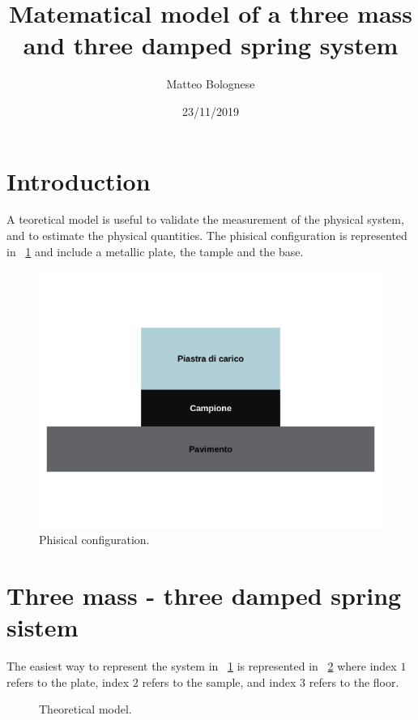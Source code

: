 \documentclass[12pt,a4paper]{article}
\begin{document}
 	\title{Matematical model of a three mass and three damped spring system} \author{Matteo Bolognese}
 	\date{23/11/2019}
 	\maketitle
 	
 \section{Introduction}
	A teoretical model is useful to validate the measurement of the physical system, and to estimate the physical quantities. The phisical configuration is represented in \figurename~\ref{fig:Phisical-configuration} and include a metallic plate, the tample and the base.
	
	\begin{figure}
		\centering
		\includegraphics[width=13cm]{Phisical-system}
		\caption{Phisical configuration.}
		\label{fig:Phisical-configuration}
	\end{figure}
 	
 \section{Three mass - three damped spring sistem}
 	The easiest way to represent the system in \figurename~\ref{fig:Phisical-configuration} is represented in \figurename~\ref{fig:model} where index $1$ refers to the plate, index $2$ refers to the sample, and index $3$ refers to the floor.
 	
 	\begin{figure}
 		\centering
 		\caption{Theoretical model.}
 		\label{fig:model}
 	\end{figure}
 
 
 
 
 
\end{document}
